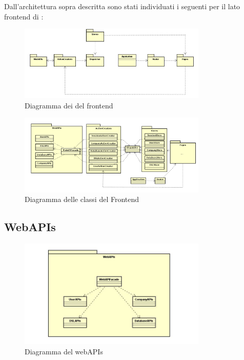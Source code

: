 Dall'architettura sopra descritta sono stati individuati i seguenti  per il lato frontend di :

\begin{figure}[H]
\centering
\includegraphics[width=0.8\textwidth]{res/sections/imgs/packages-diagram.jpg}
\caption{Diagramma dei  del frontend}
\end{figure}

\begin{figure}[H]
\centering
\includegraphics[width=0.8\textwidth]{res/sections/frontend/fullFrontend.png}
\caption{Diagramma delle classi del Frontend}
\end{figure}

\subsection{WebAPIs}

\begin{figure}[h]
\centering
\includegraphics[width=0.8\textwidth]{res/sections/imgs/webapi-diagram.jpg}
\caption{Diagramma del  webAPIs}
\end{figure}

